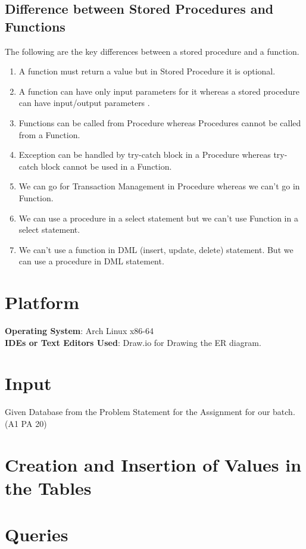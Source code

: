 \documentclass[11pt]{article}
\begin{document}
\subsection{Difference between Stored Procedures and Functions}

The following are the key differences between a stored procedure and a function.

\begin{enumerate}
    \item A function must return a value but in Stored Procedure it is optional.
    \item A function can have only input parameters for it whereas a stored procedure can have input/output parameters .
    \item Functions can be called from Procedure whereas Procedures cannot be called from a Function.
    \item Exception can be handled by try-catch block in a Procedure whereas try-catch block cannot be used in a Function.
    \item We can go for Transaction Management in Procedure whereas we can't go in Function.
    \item We can use a procedure in a select statement but we can't use Function in a select statement.
    \item We can't use a function in DML (insert, update, delete) statement. But we can use a procedure in DML statement.
\end{enumerate}


\section{Platform}

\textbf{Operating System}: Arch Linux x86-64 \\
\textbf{IDEs or Text Editors Used}: Draw.io for Drawing the ER diagram. \\

\section{Input}
Given Database from the Problem Statement for the Assignment for our batch. (A1 PA 20)
\section{Creation and Insertion of Values in the Tables}

\section{Queries}

\end{document}
